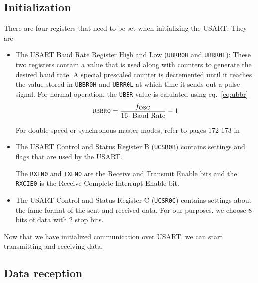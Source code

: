 \documentclass[11pt,a4paper,titlepage]{article}
\begin{document}
	\subsection{Initialization\label{sec:usartinit}}
	There are four registers that need to be set when initializing the USART. They are
	\begin{itemize}
		\item The USART Baud Rate Register High and Low (\verb|UBRR0H| and \verb|UBRR0L|): These two registers contain a value that is used along with counters to generate the desired baud rate. A special prescaled counter is decremented until it reaches the value stored in \verb|UBBR0H| and \verb|UBRR0L| at which time it sends out a pulse signal. For normal operation, the \verb|UBBR| value is calulated using eq.~\ref{eq:ubbr}
		\begin{equation}
			\verb|UBBR0| = \frac{f_{\text{OSC}}}{16\cdot\text{Baud Rate}} - 1
			\label{eq:ubbr}
		\end{equation}
		
		For double speed or synchronous master modes, refer to pages 172-173 in~\cite{atmegadatasheet}
		
		\item The USART Control and Status Register B (\verb|UCSR0B|)  contains settings and flags that are used by the USART. 
		
		The \verb|RXEN0| and \verb|TXEN0| are the Receive and Transmit Enable bits and the \verb|RXCIE0| is the Receive Complete Interrupt Enable bit.
		 
		 
		 \item The USART Control and Status Register C (\verb|UCSR0C|)  contains settings about the fame format of the sent and received data. For our purposes, we choose 8-bits of data with 2 stop bits.
		 
	\end{itemize}
	
	\noindent Now that we have initialized communication over USART, we can start transmitting and receiving data.
	
	\subsection{Data reception}
	
\end{document}
